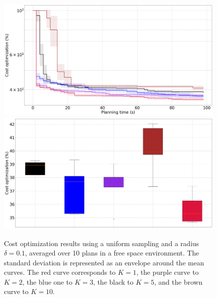 \begin{figure} [htp]
    \centering
    \includegraphics[width=0.9\linewidth]{figures/appendix/uniform_radius_0_1.png} \\
    \includegraphics[width=0.9\linewidth]{figures/appendix/bplot_uniform_radius_0_1.png}
    \caption{Cost optimization results using a uniform sampling and a radius $\delta = 0.1$, averaged over 10 plans in a free space environment. 
    The standard deviation is represented as an envelope around the mean curves.
    The red curve corresponds to $K = 1$, the purple curve to $K = 2$, the blue one to $K = 3$, the black to $K = 5$, and the brown curve to $K = 10$.}%
    \label{fig:uniform_radius_0_1}%
\end{figure}

